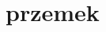 \documentclass{article}
\theoremstyle{definition}
\begin{document}
\section{przemek}
\label{p}

 

% 
%


\nocite{langley00}



\end{document}
